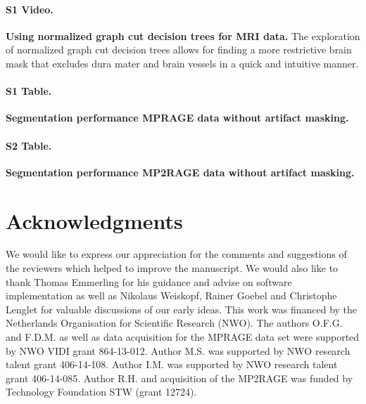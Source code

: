 \paragraph{S1 Video.}
\label{S1_Video}
{\bf Using normalized graph cut decision trees for MRI data.} The exploration of normalized graph cut decision trees allows for finding a more restrictive brain mask that excludes dura mater and brain vessels in a quick and intuitive manner.

\paragraph{S1 Table.}
\label{S1_Table}
{\bf Segmentation performance MPRAGE data without artifact masking.}

\paragraph{S2 Table.}
\label{S2_Table}
{\bf Segmentation performance MP2RAGE data without artifact masking.}

\section{Acknowledgments}
We would like to express our appreciation for the comments and suggestions of the reviewers which helped to improve the manuscript. We would also like to thank Thomas Emmerling for his guidance and advise on software implementation as well as Nikolaus Weiskopf, Rainer Goebel and Christophe Lenglet for valuable discussions of our early ideas. This work was financed by the Netherlands Organisation for Scientific Research (NWO). The authors O.F.G. and F.D.M. as well as data acquisition for the MPRAGE data set were supported by NWO VIDI grant 864-13-012. Author M.S. was supported by NWO research talent grant 406-14-108. Author I.M. was supported by NWO research talent grant 406-14-085. Author R.H. and acquisition of the MP2RAGE was funded by Technology Foundation STW (grant 12724). 


\clearpage
\printbibliography[heading=subbibnumbered, title={References}]